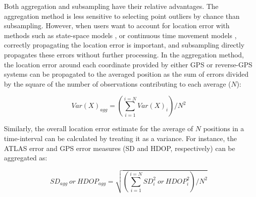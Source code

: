 \documentclass[10pt,paper=a4,headings=standardclasses
]{scrartcl}
\begin{document}
Both aggregation and subsampling have their relative advantages. 
The aggregation method is less sensitive to selecting point outliers by chance than subsampling.
However, when users want to account for location error with methods such as state-space models \citep{jonsen2003, jonsen2005, johnson2008}, or continuous time movement models \citep{fleming2014a, noonan2019, gurarie2017, calabrese2016, fleming2020}, correctly propagating the location error is important, and subsampling directly propagates these errors without further processing.
In the aggregation method, the location error around each coordinate provided by either GPS or reverse-GPS systems can be propagated to the averaged position as the sum of errors divided by the square of the number of observations contributing to each average ($N$):
\begin{linenomath*}
    \begin{equation*}
        Var(X)_{agg} = \left( \sum_{i=1}^{i=N} Var(X)_i \right) / N ^ 2
    \end{equation*}
\end{linenomath*}
Similarly, the overall location error estimate for the average of $N$ positions in a time-interval can be calculated by treating it as a variance. For instance, the ATLAS error and GPS error measures (SD and HDOP, respectively) can be aggregated as:
\begin{linenomath*}
    \begin{equation*}
        SD_{agg} \ or \ HDOP_{agg} = \sqrt{ \left( \sum_{i=1}^{i=N} SD_i^2 \ or \ HDOP_i^2 \right) / N ^ 2  }
    \end{equation*}    
\end{linenomath*}
\end{document}
